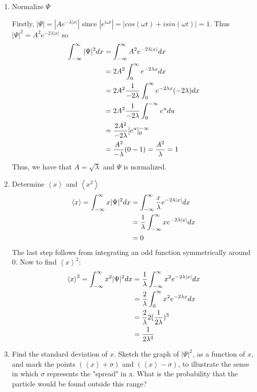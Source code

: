 \documentclass{article}
\newcommand{\braket}[1]{\left\langle #1 \right\rangle}
\begin{document}
  \begin{enumerate}[label=(\alph*)]
    \item Normalize $\Psi$

      Firstly, $|\Psi| = |Ae^{-\lambda|x|}|$ since $|e^{i\omega t}| = |cos(\omega t) + i sin(\omega t)| = 1$.
      Thus $|\Psi|^2 = A^2 e^{-2\lambda|x|}$ so
      \begin{align*}
        \int_{-\infty}^\infty |\Psi|^2 dx &= \int_{-\infty}^\infty A^2 e^{-2\lambda |x|} dx \\
                            &= 2A^2 \int_{0}^\infty e^{-2 \lambda x} dx \\
                            &= 2A^2 \frac{1}{-2\lambda} \int_{0}^\infty e^{-2 \lambda x} (-2 \lambda) dx \\
                            &= 2A^2 \frac{1}{-2\lambda} \int_{0}^{-\infty} e^{u}du \\
                            &= \frac{2A^2}{-2 \lambda} [e^u]_0^{-\infty} \\
                            &= \frac{A^2}{-\lambda} (0 - 1) = \frac{A^2}{\lambda} = 1
      \end{align*}
      Thus, we have that $A = \sqrt{\lambda}$ and $\Psi$ is normalized.

    \item Determine $\braket{x}$ and $\braket{x^2}$
      \begin{align*}
        \braket{x} = \intinf x|\Psi|^2 dx &= \intinf \frac{x}{\lambda} e^{-2\lambda|x|}dx \\
                             &= \frac1\lambda \intinf x e^{-2 \lambda |x|} dx \\
                             &= 0 
      \end{align*}
      The last step follows from integrating an odd function symmetrically around 0. Now to find $\braket{x}^2$:
      \begin{align*}
        \braket{x}^2 = \intinf x^2|\Psi|^2 dx &= \frac1\lambda \intinf x^2 e^{-2\lambda|x|}dx \\
                                              &= \frac2\lambda \intzinf x^2 e^{-2\lambda x} dx \\
                                              &= \frac2\lambda 2 (\frac1{2\lambda})^3 \\
                                              &= \frac1{2\lambda ^4} 
      \end{align*}

    \item Find the standard deviation of $x$. 
      Sketch the graph of $|\Psi|^2$, as a function of $x$, and mark the points $(\braket{x} + \sigma)$ and $(\braket{x} - \sigma)$, to illustrate the sense in which $\sigma$ represents the "spread" in x.
      What is the probability that the particle would be found outside this range?


\end{enumerate}
\end{document}
